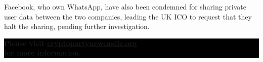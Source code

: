 \documentclass[10.5pt,a4paper]{article} %
\begin{document}
\begin{multicols*}{2}
Facebook, who own WhatsApp, have also been condemned for sharing private user data between the two companies, leading the UK ICO to request that they halt the sharing, pending further investigation.


\begin{center}
	\vfill %
	\colorbox{Black}{
		\begin{minipage}{8cm}
			\color{white}
			\vspace{0.2cm}
			\begin{center}
				\textbf{{\Large Please visit \url{cryptopartynewcastle.org}\\for more information.}}
			\end{center}
			\vspace{0.2cm}
		\end{minipage}
	}
\end{center}

\vspace{0.75cm}

\end{multicols*}
\end{document}
